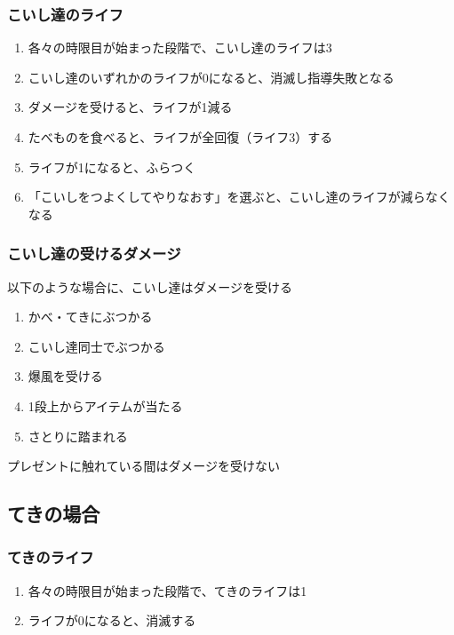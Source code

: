 \subsubsection{こいし達のライフ}
\begin{enumerate}[label={\sarrow}]
\item 各々の時限目が始まった段階で、こいし達のライフは3
\item こいし達のいずれかのライフが0になると、消滅し指導失敗となる
\item ダメージを受けると、ライフが1減る
\item たべものを食べると、ライフが全回復（ライフ3）する
\item ライフが1になると、ふらつく
\item 「こいしをつよくしてやりなおす」を選ぶと、こいし達のライフが減らなくなる
\end{enumerate}

\subsubsection{こいし達の受けるダメージ}
以下のような場合に、こいし達はダメージを受ける
\begin{enumerate}[label={\sarrow}]
\item かべ・てきにぶつかる
\item こいし達同士でぶつかる
\item 爆風を受ける
\item 1段上からアイテムが当たる
\item さとりに踏まれる
\end{enumerate}
\begin{marker}
プレゼントに触れている間はダメージを受けない
\end{marker}


\subsection{てきの場合}

\subsubsection{てきのライフ}
\begin{enumerate}[label={\sarrow}]
\item 各々の時限目が始まった段階で、てきのライフは1
\item ライフが0になると、消滅する
\end{enumerate}

